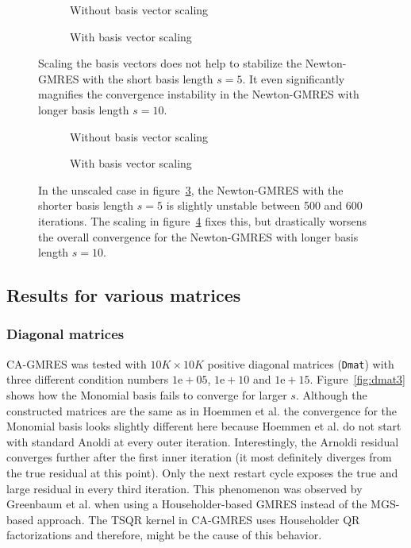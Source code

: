 \documentclass{scrartcl}
\numberwithin{equation}{section}
\begin{document}
\begin{figure}[H]
\centering
\begin{subfigure}{.5\textwidth}
	\centering
	\resizebox{.9\textwidth}{!}{}
	\caption{Without basis vector scaling}
	\label{fig:bcsstk18_noscale}
\end{subfigure}%
\begin{subfigure}{.5\textwidth}
	\centering
	\resizebox{.9\textwidth}{!}{}
	\caption{With basis vector scaling}
	\label{fig:bcsstk18_scale}
\end{subfigure}
\caption{Scaling the basis vectors does not help to stabilize the Newton-GMRES with the short basis length $s = 5$. It even significantly magnifies the convergence instability in the Newton-GMRES with longer basis length $s = 10$.}
\label{fig:bcsstk18_scaleissue}
\begin{subfigure}{.5\textwidth}
	\centering
	\resizebox{.9\textwidth}{!}{}
	\caption{Without basis vector scaling}
	\label{fig:pwtk_noscale}
\end{subfigure}%
\begin{subfigure}{.5\textwidth}
	\centering
	\resizebox{.9\textwidth}{!}{}
	\caption{With basis vector scaling}
	\label{fig:pwtk_scale}
\end{subfigure}
\caption{In the unscaled case in figure~\ref{fig:pwtk_noscale}, the Newton-GMRES with the shorter basis length $s = 5$ is slightly unstable between 500 and 600 iterations. The scaling in figure~\ref{fig:pwtk_scale} fixes this, but drastically worsens the overall convergence for the Newton-GMRES with longer basis length $s = 10$.}
\label{fig:convergence_scaleissue}
\end{figure}

\subsection{Results for various matrices}
\subsubsection{Diagonal matrices}
CA-GMRES was tested with $10K \times 10K$ positive diagonal matrices (\texttt{Dmat}) with three different condition numbers $1\text{e}+05$, $1\text{e}+10$ and $1\text{e}+15$. Figure~\ref{fig:dmat3} shows how the Monomial basis fails to converge for larger $s$. Although the constructed matrices are the same as in Hoemmen et al. \cite{Hoemmen:2010:CKS:1970638} the convergence for the Monomial basis looks slightly different here because Hoemmen et al. do not start with standard Anoldi at every outer iteration. Interestingly, the Arnoldi residual converges further after the first inner iteration (it most definitely  diverges from the true residual at this point). Only the next restart cycle exposes the true and large residual in every third iteration. This phenomenon was observed by Greenbaum et al. \cite{Greenbaum97numericalbehaviour} when using a Householder-based GMRES instead of the MGS-based approach. The TSQR kernel in CA-GMRES uses Householder QR factorizations and therefore, might be the cause of this behavior.
\end{document}
